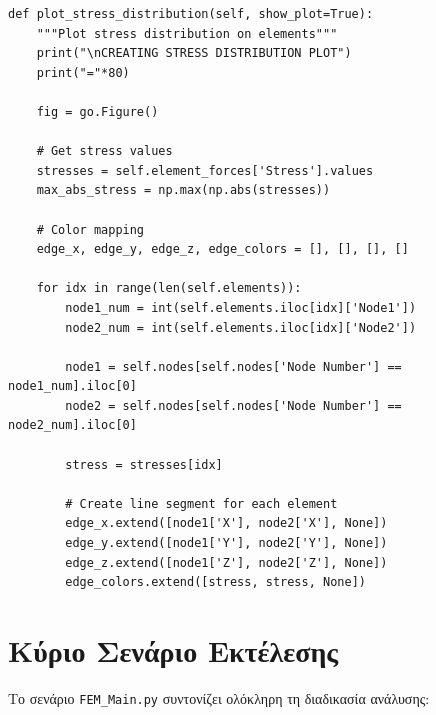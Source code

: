 \documentclass[12pt,a4paper]{article}
\begin{document}
\begin{lstlisting}[caption={Γράφημα Κατανομής Τάσεων (Μερικό)}]
def plot_stress_distribution(self, show_plot=True):
    """Plot stress distribution on elements"""
    print("\nCREATING STRESS DISTRIBUTION PLOT")
    print("="*80)
    
    fig = go.Figure()
    
    # Get stress values
    stresses = self.element_forces['Stress'].values
    max_abs_stress = np.max(np.abs(stresses))
    
    # Color mapping
    edge_x, edge_y, edge_z, edge_colors = [], [], [], []
    
    for idx in range(len(self.elements)):
        node1_num = int(self.elements.iloc[idx]['Node1'])
        node2_num = int(self.elements.iloc[idx]['Node2'])
        
        node1 = self.nodes[self.nodes['Node Number'] == node1_num].iloc[0]
        node2 = self.nodes[self.nodes['Node Number'] == node2_num].iloc[0]
        
        stress = stresses[idx]
        
        # Create line segment for each element
        edge_x.extend([node1['X'], node2['X'], None])
        edge_y.extend([node1['Y'], node2['Y'], None])
        edge_z.extend([node1['Z'], node2['Z'], None])
        edge_colors.extend([stress, stress, None])
\end{lstlisting}

\section{Κύριο Σενάριο Εκτέλεσης}

Το σενάριο \texttt{FEM\_Main.py} συντονίζει ολόκληρη τη διαδικασία ανάλυσης:
\end{document}
